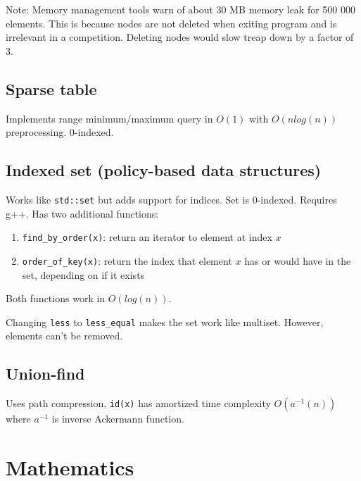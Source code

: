 \documentclass{article}
\begin{document}
Note: Memory management tools warn of about 30 MB memory leak for 500 000 elements. This is because nodes are not deleted when exiting program and is irrelevant in a competition. Deleting nodes would slow treap down by a factor of 3.



\subsection {Sparse table}

Implements range minimum/maximum query in $O(1)$ with $O(n log(n))$ preprocessing. $0$-indexed.



\subsection {Indexed set (policy-based data structures)}

Works like \texttt{std::set} but adds support for indices. Set is 0-indexed. Requires g++. Has two additional functions:

\begin{enumerate}
	\item \verb|find_by_order(x)|: return an iterator to element at index $x$
	\item \verb|order_of_key(x)|: return the index that element $x$ has or would have in the set, depending on if it exists
\end{enumerate}

Both functions work in $O(log(n))$.

Changing \texttt{less} to \verb|less_equal| makes the set work like multiset. However, elements can't be removed.



\subsection{Union-find}

Uses path compression, \texttt{id(x)} has amortized time complexity $O(a^{-1}(n))$ where $a^{-1}$ is inverse Ackermann function.



\section {Mathematics}
\end{document}
